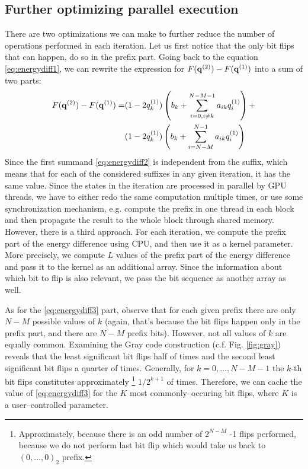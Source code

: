 \subsection{Further optimizing parallel execution}

There are two optimizations we can make to further reduce the number of
operations performed in each iteration. Let us first notice that the only bit
flips that can happen, do so in the prefix part. Going back to the equation
\eqref{eq:energydiff1}, we can rewrite the expression for $F(\mathbf{q}^{(2)})-F(\mathbf{q}^{(1)})$
into a sum of two parts:
\begin{align}
  F(\mathbf{q}^{(2)})-F(\mathbf{q}^{(1)}) = & (1-2q^{(1)}_{k}) \left(b_{k} + \sum_{i=0,i\ne k}^{N-M-1}a_{ik}q^{(1)}_{i}\right) + \label{eq:energydiff2} \\
                        & (1-2q^{(1)}_{k}) \left(b_{k} + \sum_{i=N-M}^{N-1}a_{ik}q^{(1)}_{i}\right)\label{eq:energydiff3}
\end{align}
Since the first summand \eqref{eq:energydiff2} is independent from the suffix,
which means that for each of the considered suffixes in any given iteration, it
has the same value. Since the states in the iteration are processed in parallel
by GPU threads, we have to either redo the same computation multiple times, or
use some synchronization mechanism, e.g. compute the prefix in one thread in
each block and then propagate the result to the whole block through shared
memory. However, there is a third approach. For each iteration, we compute the
prefix part of the energy difference using CPU, and then use it as a kernel
parameter. More precisely, we compute $L$ values of the prefix part of the
energy difference and pass it to the kernel as an additional array. Since the
information about which bit to flip is also relevant, we pass the bit sequence
as another array as well.

As for the \eqref{eq:energydiff3} part, observe that for each given prefix
there are only $N-M$ possible values of $k$ (again, that's because the bit
flips happen only in the prefix part, and there are $N-M$ prefix bits).
However, not all values of $k$ are equally common. Examining the Gray code
construction (c.f. Fig. \ref{fig:gray}) reveals that the least significant bit
flips half of times and the second least significant bit flips a quarter of
times. Generally, for $k=0,\ldots,N-M-1$ the $k$-th bit flips constitutes
approximately \footnote{Approximately, because there is an odd number of
  $2^{N-M}$ -1 flips performed, because we do not perform last bit flip which
  would take us back to $(0,\ldots,0)_2$ prefix.} $1/2^{k+1}$ of times.
Therefore, we can cache the value of \eqref{eq:energydiff3} for the $K$ most
commonly--occuring bit flips, where $K$ is a user--controlled parameter.


